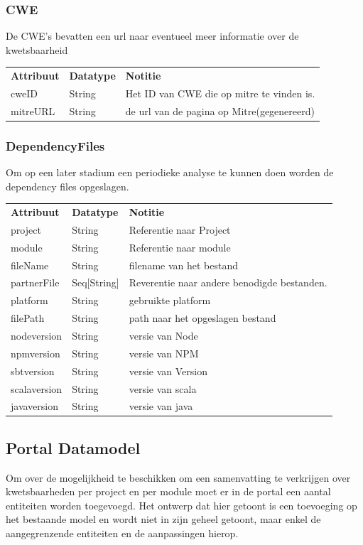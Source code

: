 \subsubsection{CWE}\label{subsubsec:cwe}
De CWE's bevatten een url naar eventueel meer informatie over de kwetsbaarheid

\begin{tabular}{lll}
    \textbf{Attribuut} & \textbf{Datatype} & \textbf{Notitie}\\
    cweID & String & Het ID van CWE die op mitre te vinden is.\\
    mitreURL & String & de url van de pagina op Mitre(gegenereerd)\\
\end{tabular}

\subsubsection{DependencyFiles}\label{subsubsec:dependencyFiles}
Om op een later stadium een periodieke analyse te kunnen doen worden de dependency files opgeslagen.

\begin{tabular}{lll}
    \textbf{Attribuut} & \textbf{Datatype} & \textbf{Notitie}\\
    project & String & Referentie naar Project\\
    module & String & Referentie naar module \\
    fileName & String & filename van het bestand \\
    partnerFile & Seq[String] & Reverentie naar andere benodigde bestanden.\\
    platform & String & gebruikte platform \\
    filePath & String & path naar het opgeslagen bestand \\ %
    nodeversion & String & versie van Node  \\
    npmversion & String & versie van NPM  \\
    sbtversion & String & versie van Version  \\
    scalaversion & String & versie van scala  \\
    javaversion & String & versie van java \\
\end{tabular}

\subsection{Portal Datamodel}\label{subsec:portal-datamodel}
Om over de mogelijkheid te beschikken om een samenvatting te verkrijgen over kwetsbaarheden per project en per module moet er in de portal een aantal entiteiten worden toegevoegd. Het ontwerp dat hier getoont is een toevoeging op het bestaande model en wordt niet in zijn geheel getoont, maar enkel de aangegrenzende entiteiten en de aanpassingen hierop.

